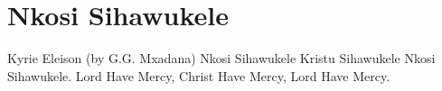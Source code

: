 \starttocol
\chapter{Nkosi Sihawukele}
\nexttocol
\startlines
K{\sc yrie Eleison}\hfill{\it }
(by G.G. Mxadana)
\stoplines
\stoptocol
\starttocol
\startlines
N{\sc kosi} Sihawukele
Kristu Sihawukele
Nkosi Sihawukele.
\stoplines
\nexttocol
\startlines
Lord Have Mercy,
Christ Have Mercy,
Lord Have Mercy.
\stoplines
\stoptocol
